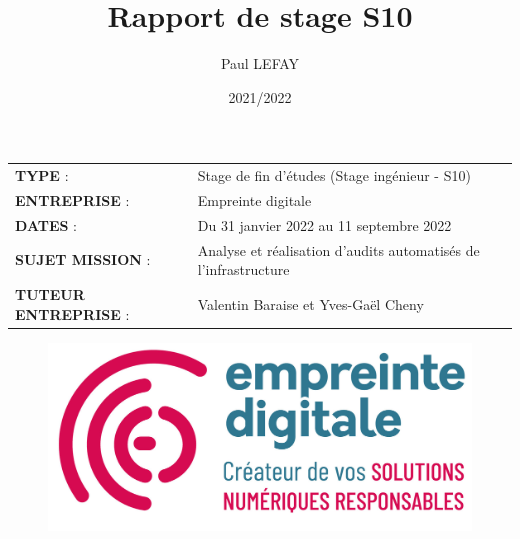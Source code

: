 \documentclass[12pt]{article}
\title{Rapport de stage S10}
\author{Paul LEFAY}
\date{2021/2022}
\begin{document}
\cfoot{\thepage}

\renewcommand{\headrulewidth}{0.4pt}
\renewcommand{\footrulewidth}{0.4pt}
\renewcommand{\contentsname}{Table des matières}
\renewcommand{\listfigurename}{}
\renewcommand{\listtablename}{}
\renewcommand{\thebibliography}{}

\maketitle
\thispagestyle{empty}
\begin{center}
	\begin{tabular}{ m{5cm} m{11.5cm} }
	\textbf{TYPE} : & \mbox{\ooalign{$\checkmark$\cr\hidewidth$\square$\hidewidth\cr}}  Stage de fin d'études (Stage ingénieur - S10) \\
   \textbf{ENTREPRISE} :  & Empreinte digitale \\
   \textbf{DATES} : & Du 31 janvier 2022 au 11 septembre 2022 \\
   \textbf{SUJET MISSION} : & Analyse et réalisation d'audits automatisés de l'infrastructure \\
   \textbf{TUTEUR ENTREPRISE} :  & Valentin Baraise et Yves-Gaël Cheny \\
 \end{tabular}
\end{center}

\begin{figure}[!ht]
    \centering
    \includegraphics[scale=0.8]{src/ed_logo.png}
    \label{fig:ed_logo}
\end{figure}
\end{document}
